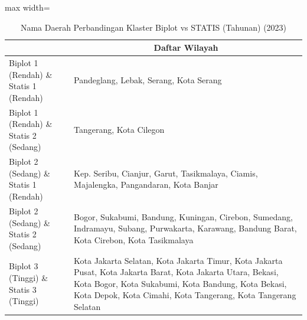 \begin{table}[H]
\centering
\caption{Nama Daerah Perbandingan Klaster Biplot vs STATIS (Tahunan) (2023)} \label{tab:app1biplot_statis_comp_name_2023}
\begin{adjustbox}{max width=\textwidth}
\begin{tabular}{|>{\centering\arraybackslash}p{4cm}|p{10cm}|}
\hline
\multicolumn{1}{|c|}{\textbf{Kategori}} & \multicolumn{1}{c|}{\textbf{Daftar Wilayah}} \\
\hline
Biplot 1 (Rendah) \& Statis 1 (Rendah) & Pandeglang, Lebak, Serang, Kota Serang \\
\hline
Biplot 1 (Rendah) \& Statis 2 (Sedang) & Tangerang, Kota Cilegon \\
\hline
Biplot 2 (Sedang) \& Statis 1 (Rendah) & Kep. Seribu, Cianjur, Garut, Tasikmalaya, Ciamis, Majalengka, Pangandaran, Kota Banjar \\
\hline
Biplot 2 (Sedang) \& Statis 2 (Sedang) & Bogor, Sukabumi, Bandung, Kuningan, Cirebon, Sumedang, Indramayu, Subang, Purwakarta, Karawang, Bandung Barat, Kota Cirebon, Kota Tasikmalaya \\
\hline
Biplot 3 (Tinggi) \& Statis 3 (Tinggi) & Kota Jakarta Selatan, Kota Jakarta Timur, Kota Jakarta Pusat, Kota Jakarta Barat, Kota Jakarta Utara, Bekasi, Kota Bogor, Kota Sukabumi, Kota Bandung, Kota Bekasi, Kota Depok, Kota Cimahi, Kota Tangerang, Kota Tangerang Selatan \\
\hline
\end{tabular}
\end{adjustbox}
\end{table}